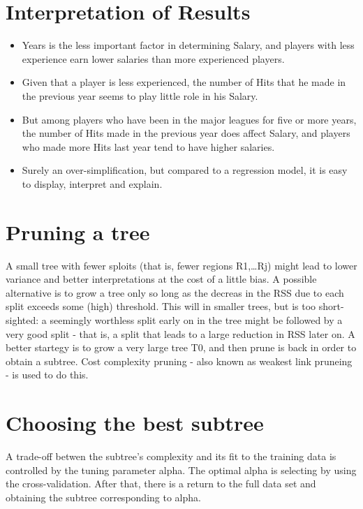 \documentclass[]{report}
\providecommand{\tightlist}{%
  \setlength{\itemsep}{0pt}\setlength{\parskip}{0pt}}
\begin{document}
\section{Interpretation of Results}\label{interpretation-of-results}

\begin{itemize}
\tightlist
\item
  Years is the less important factor in determining Salary, and players
  with less experience earn lower salaries than more experienced
  players.
\item
  Given that a player is less experienced, the number of Hits that he
  made in the previous year seems to play little role in his Salary.
\item
  But among players who have been in the major leagues for five or more
  years, the number of Hits made in the previous year does affect
  Salary, and players who made more Hits last year tend to have higher
  salaries.
\item
  Surely an over-simplification, but compared to a regression model, it
  is easy to display, interpret and explain.
\end{itemize}

\section{Pruning a tree}\label{pruning-a-tree}

A small tree with fewer sploits (that is, fewer regions R1,\ldots{}Rj)
might lead to lower variance and better interpretations at the cost of a
little bias. A possible alternative is to grow a tree only so long as
the decreas in the RSS due to each split exceeds some (high) threshold.
This will in smaller trees, but is too short-sighted: a seemingly
worthless split early on in the tree might be followed by a very good
split - that is, a split that leads to a large reduction in RSS later
on. A better startegy is to grow a very large tree T0, and then prune is
back in order to obtain a subtree. Cost complexity pruning - also known
as weakest link pruneing - is used to do this.

\section{Choosing the best subtree}\label{choosing-the-best-subtree}

A trade-off betwen the subtree's complexity and its fit to the training
data is controlled by the tuning parameter alpha. The optimal alpha is
selecting by using the cross-validation. After that, there is a return
to the full data set and obtaining the subtree corresponding to alpha.
\end{document}
